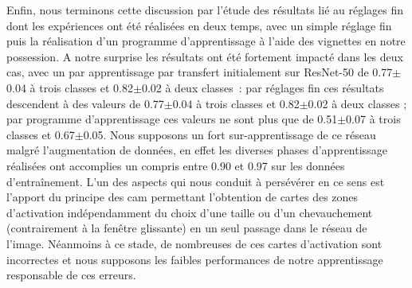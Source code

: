 Enfin, nous terminons cette discussion par l'étude des résultats lié au réglages fin dont les expériences ont été réalisées en deux temps, avec un simple réglage fin puis la réalisation d'un programme d'apprentissage à l'aide des vignettes en notre possession. A notre surprise les résultats ont été fortement impacté dans les deux cas, avec un \fscore{} par apprentissage par transfert initialement sur ResNet-50 de 0.77$\pm$0.04 à trois classes et 0.82$\pm$0.02 à deux classes~: par réglages fin ces résultats descendent à des valeurs de 0.77$\pm$0.04 à trois classes et 0.82$\pm$0.02 à deux classes ; par programme d'apprentissage ces valeurs ne sont plus que de 0.51$\pm$0.07 à trois classes et 0.67$\pm$0.05. Nous supposons un fort sur-apprentissage de ce réseau malgré l'augmentation de données, en effet les diverses phases d'apprentissage réalisées ont accomplies un \fscore{} compris entre 0.90 et 0.97 sur les données d'entraînement. L'un des aspects qui nous conduit à persévérer en ce sens est l'apport du principe des \gls{cam} permettant l'obtention de cartes des zones d'activation indépendamment du choix d'une taille ou d'un chevauchement (contrairement à la fenêtre glissante) en un seul passage dans le réseau de l'image. Néanmoins à ce stade, de nombreuses de ces cartes d'activation sont incorrectes et nous supposons les faibles performances de notre apprentissage responsable de ces erreurs.\par